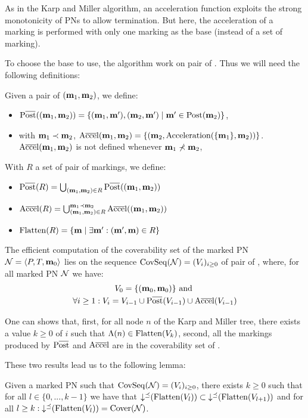 As in the Karp and Miller algorithm, an acceleration function exploits the strong monotonicity of \acp{PN} to allow termination.
But here, the acceleration of a marking is performed with only one marking as the base (instead of a set of marking).

To choose the base to use, the algorithm work on pair of \omarks.
Thus we will need the following definitions:

Given a pair of \omarks $(\mathbf{m}_1, \mathbf{m}_2)$, we define:
\begin{itemize}
  \item $\Postb((\marq_1, \marq_2)) = \{(\marq_1, \marqp), (\marq_2, \marqp) \mid \marqp \in \Post(\marq_2)\}$,
  \item with $\mathbf{m}_1 \prec \mathbf{m}_2$, $\operatorname{A\overline{cce}l}(\mathbf{m}_1, \mathbf{m}_2) = \{(\mathbf{m}_2, \operatorname{Acceleration}(\{\mathbf{m}_1\}, \mathbf{m}_2))\}$.
    $\operatorname{A\overline{cce}l}(\mathbf{m}_1, \mathbf{m}_2)$ is not defined whenever $\mathbf{m}_1 \nprec \mathbf{m}_2$,
\end{itemize}

With $R$ a set of pair of markings, we define:
\begin{itemize}
  \item $\Postb(R) = \bigcup_{(\marq_1, \marq_2) \in R} \Postb((\marq_1, \marq_2))$
  \item $\operatorname{A\overline{cce}l}(R) = \bigcup_{(\mathbf{m}_1, \mathbf{m}_2) \in R}^{\mathbf{m}_1 \prec \mathbf{m}_2} \operatorname{A\overline{cce}l}((\mathbf{m}_1, \mathbf{m}_2))$
  \item $\operatorname{Flatten}(R) = \{\mathbf{m} \mid \exists \mathbf{m'} : (\mathbf{m'}, \mathbf{m}) \in R\}$
\end{itemize}

The efficient computation of the coverability set of the marked \ac{PN} $\mathcal{N} = \langle P,T, \mathbf{m}_0\rangle$ lies on the sequence $\operatorname{CovSeq}(\mathcal{N}) = (V_i)_{i \geq 0}$ of pair of \omarks, where, for all marked \ac{PN} $\mathcal{N}$ we have:
\begin{gather*}
  V_0 = \{(\marqi, \marqi)\} \text{ and } \\
  \forall i \geq 1 : V_i = V_{i-1} \cup \Postb(V_{i-1}) \cup \Accelb(V_{i-1})
\end{gather*}

One can shows that,
first, for all node $n$ of the Karp and Miller tree, there exists a value $k \geq 0$ of $i$ such that $\Lambda(n) \in \operatorname{Flatten}(V_k)$,
second, all the markings produced by $\Postb$ and $\operatorname{A\overline{cce}l}$ are in the coverability set of \tupleN.

These two results lead us to the following lemma:
\begin{lemm}
  Given a marked \ac{PN} \tupleN such that $\operatorname{CovSeq}(\mathcal{N}) = (V_i)_{i \geq 0}$,
  there exists $k \geq 0$ such that for all $l \in \{0, ..., k-1\}$ we have that $\operatorname{\downarrow^\preceq}(\operatorname{Flatten}(V_l)) \subset \operatorname{\downarrow^\preceq}(\operatorname{Flatten}(V_{l+1}))$
  and for all $l \geq k : \operatorname{\downarrow^\preceq}(\operatorname{Flatten}(V_l)) = \operatorname{Cover}(\mathcal{N})$.
\end{lemm}

